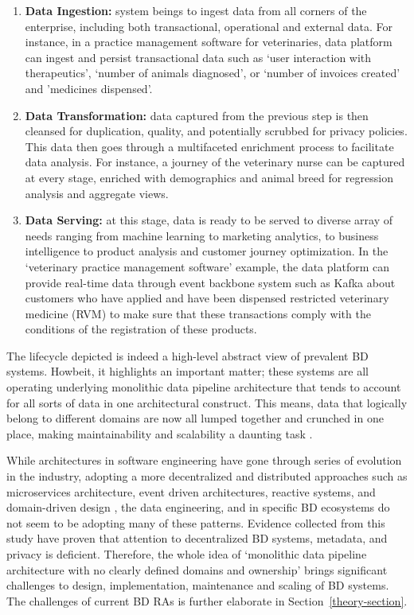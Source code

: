 \documentclass[review]{elsarticle}
\begin{document}
\begin{enumerate}
    \item \textbf{Data Ingestion:} system beings to ingest data from all corners of the enterprise, including both transactional, operational and external data. For instance, in a practice management software for veterinaries, data platform can ingest and persist transactional data such as `user interaction with therapeutics', `number of animals diagnosed', or `number of invoices created' and 'medicines dispensed'.
    \item \textbf{Data Transformation:} data captured from the previous step is then cleansed for duplication, quality, and potentially scrubbed for privacy policies. This data then goes through a multifaceted enrichment process to facilitate data analysis. For instance, a journey of the veterinary nurse can be captured at every stage, enriched with demographics and animal breed for regression analysis and aggregate views.
    \item \textbf{Data Serving:} at this stage, data is ready to be served to diverse array of needs ranging from machine learning to marketing analytics, to business intelligence to product analysis and customer journey optimization. In the `veterinary practice management software' example, the data platform can provide real-time data through event backbone system such as Kafka about customers who have applied and have been dispensed restricted veterinary medicine (RVM) to make sure that these transactions comply with the conditions of the registration of these products.
\end{enumerate}

The lifecycle depicted is indeed a high-level abstract view of prevalent BD systems. Howbeit, it highlights an important matter; these systems are all operating underlying monolithic data pipeline architecture that tends to account for all sorts of data in one architectural construct. This means, data that logically belong to different domains are now all lumped together and crunched in one place, making maintainability and scalability a daunting task \cite{monolithToMesh}.

While architectures in software engineering have gone through series of evolution in the industry, adopting a more decentralized and distributed approaches such as microservices architecture, event driven architectures, reactive systems, and domain-driven design \cite{alshuqayran2016systematic}, the data engineering, and in specific BD ecosystems do not seem to be adopting many of these patterns. Evidence collected from this study have proven that attention to decentralized BD systems, metadata, and privacy is deficient. Therefore, the whole idea of `monolithic data pipeline architecture with no clearly defined domains and ownership' brings significant challenges to design, implementation, maintenance and scaling of BD systems. The challenges of current BD RAs is further elaborate in Section~\ref{theory-section}.
\end{document}
